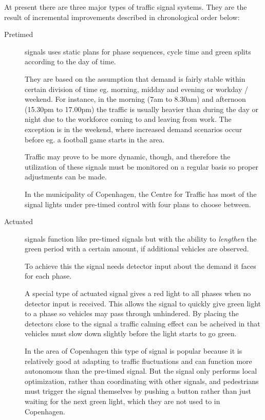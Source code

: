 \label{signal_types}

At present there are three major types of traffic signal systems. They are the result of incremental improvements described in chronological order below:

\begin{description}
\item[Pretimed] signals uses static plans for phase sequences, cycle time and green splits according to the day of time. 

They are based on the assumption that demand is fairly stable within certain division of time eg. morning, midday and evening or workday / weekend. For instance, in the morning (7am to 8.30am) and afternoon (15.30pm to 17.00pm) the traffic is usually heavier than during the day or night due to the workforce coming to and leaving from work. The exception is in the weekend, where increased demand scenarios occur before eg. a football game starts in the area.

Traffic may prove to be more dynamic, though, and therefore the utilization of these signals must be monitored on a regular basis so proper adjustments can be made.

In the municipality of Copenhagen, the Centre for Traffic has most of the signal lights under pre-timed control with four plans to choose between.
\item[Actuated] signals function like pre-timed signals but with the ability to \textit{lengthen} the green period with a certain amount, if additional vehicles are observed. 

To achieve this the signal needs detector input about the demand it faces for each phase.

A special type of actuated signal gives a red light to all phases when no detector input is received. This allows the signal to quickly give green light to a phase so vehicles may pass through unhindered. By placing the detectors close to the signal a traffic calming effect can be acheived in that vehicles must slow down slightly before the light starts to go green.

In the area of Copenhagen this type of signal is popular because it is relatively good at adapting to traffic fluctuations and can function more autonomous than the pre-timed signal. But the signal only performs local optimization, rather than coordinating with other signals, and pedestrians must trigger the signal themselves by pushing a button rather than just waiting for the next green light, which they are not used to in Copenhagen.


\end{description}
